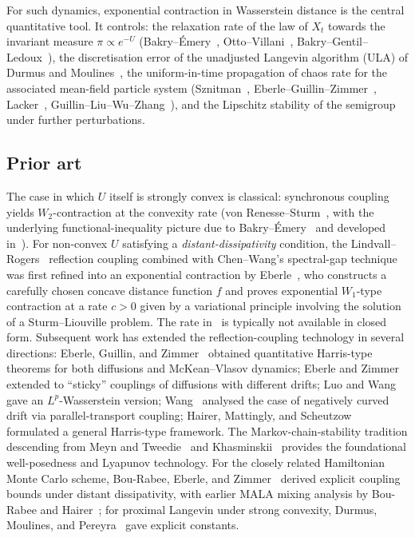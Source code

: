 \documentclass[11pt]{article}
\theoremstyle{definition}
\begin{document}
For such dynamics, exponential contraction in Wasserstein distance is the central quantitative tool. It controls: the relaxation rate of the law of $X_t$ towards the invariant measure $\pi \propto e^{-U}$ (Bakry--\'Emery~\cite{BakryEmery1985}, Otto--Villani~\cite{OttoVillani2000}, Bakry--Gentil--Ledoux~\cite{BakryGentilLedoux2014}), the discretisation error of the unadjusted Langevin algorithm (ULA) of Durmus and Moulines~\cite{DurmusMoulines2019,Dalalyan2017,DurmusMajewskiMiasojedow2019}, the uniform-in-time propagation of chaos rate for the associated mean-field particle system (Sznitman~\cite{Sznitman1991}, Eberle--Guillin--Zimmer~\cite{EberleGuillinZimmer2019}, Lacker~\cite{Lacker2018,Lacker2023}, Guillin--Liu--Wu--Zhang~\cite{GuillinLiuWuZhang2022}), and the Lipschitz stability of the semigroup under further perturbations.

\subsection{Prior art}

The case in which $U$ itself is strongly convex is classical: synchronous coupling yields $W_2$-contraction at the convexity rate (von Renesse--Sturm~\cite{vonRenesseSturm2005}, with the underlying functional-inequality picture due to Bakry--\'Emery~\cite{BakryEmery1985} and developed in~\cite{BakryGentilLedoux2014,Villani2003,Villani2009}). For non-convex $U$ satisfying a \emph{distant-dissipativity} condition, the Lindvall--Rogers~\cite{LindvallRogers1986} reflection coupling combined with Chen--Wang's spectral-gap technique~\cite{ChenWang1997} was first refined into an exponential contraction by Eberle~\cite{Eberle2011,Eberle2016}, who constructs a carefully chosen concave distance function $f$ and proves exponential $W_1$-type contraction at a rate $c > 0$ given by a variational principle involving the solution of a Sturm--Liouville problem. The rate in~\cite{Eberle2016} is typically not available in closed form. Subsequent work has extended the reflection-coupling technology in several directions: Eberle, Guillin, and Zimmer~\cite{EberleGuillinZimmer2019} obtained quantitative Harris-type theorems for both diffusions and McKean--Vlasov dynamics; Eberle and Zimmer~\cite{EberleZimmer2019} extended to ``sticky'' couplings of diffusions with different drifts; Luo and Wang~\cite{LuoWang2016} gave an $L^p$-Wasserstein version; Wang~\cite{Wang2020} analysed the case of negatively curved drift via parallel-transport coupling; Hairer, Mattingly, and Scheutzow~\cite{HairerMattinglyScheutzow2011} formulated a general Harris-type framework. The Markov-chain-stability tradition descending from Meyn and Tweedie~\cite{MeynTweedie1993} and Khasminskii~\cite{KhasminskiiBook} provides the foundational well-posedness and Lyapunov technology. For the closely related Hamiltonian Monte Carlo scheme, Bou-Rabee, Eberle, and Zimmer~\cite{BouRabeeEberleZimmer2020} derived explicit coupling bounds under distant dissipativity, with earlier MALA mixing analysis by Bou-Rabee and Hairer~\cite{BouRabeeHairer2013}; for proximal Langevin under strong convexity, Durmus, Moulines, and Pereyra~\cite{DurmusMoulinesPereyra2018} gave explicit constants.
\end{document}
